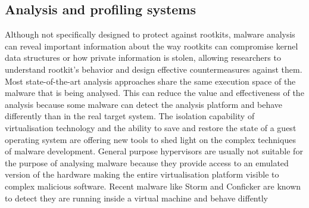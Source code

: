 \subsection{Analysis and profiling systems} \label{profiling}
Although not specifically designed to protect against rootkits, malware analysis can reveal important information about the way rootkits can compromise kernel data structures or how private information is stolen, allowing researchers to understand rootkit's behavior and design effective countermeasures against them. 
Most state-of-the-art analysis approaches share the same execution space of the malware that is being analysed. This can reduce the value and effectiveness of the analysis because some malware can detect the analysis platform and behave differently than in the real target system. 
The isolation capability of virtualisation technology and the ability to save and restore the state of a guest operating system are offering new tools to shed light on the complex techniques of malware development. 
General purpose hypervisors are usually not suitable for the purpose of analysing malware because they provide access to an emulated version of the hardware making the entire virtualisation platform visible to complex malicious software. 
Recent malware like Storm and Conficker are known to detect they are running inside a virtual machine and behave diffently \cite{conficker, ecards}


